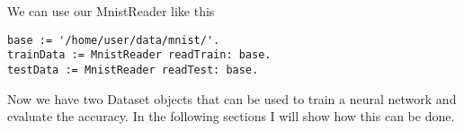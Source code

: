 We can use our MnistReader like this

\begin{lstlisting}
base := '/home/user/data/mnist/'.
trainData := MnistReader readTrain: base.
testData := MnistReader readTest: base.
\end{lstlisting}

Now we have two Dataset objects that can be used to train a neural network and evaluate the accuracy. In the following sections I will show how this can be done.
